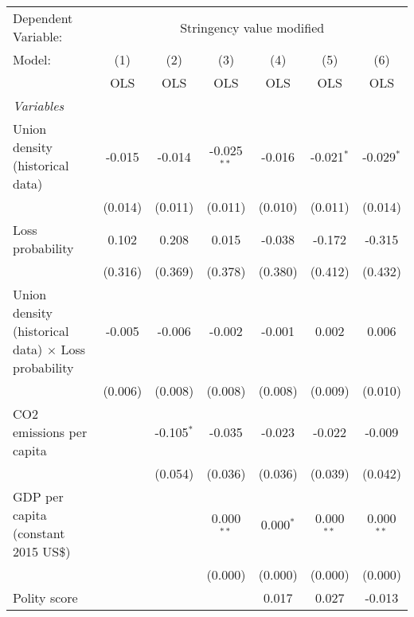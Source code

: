 
\begingroup
\centering
\begin{tabular}{lcccccc}
   \toprule
   Dependent Variable: & \multicolumn{6}{c}{Stringency value modified}\\
   Model:                                                     & (1)     & (2)          & (3)           & (4)         & (5)          & (6)\\  
                                                              &  OLS    & OLS          & OLS           & OLS         & OLS          & OLS\\  
   \midrule
   \emph{Variables}\\
   Union density (historical data)                            & -0.015  & -0.014       & -0.025$^{**}$ & -0.016      & -0.021$^{*}$ & -0.029$^{*}$\\   
                                                              & (0.014) & (0.011)      & (0.011)       & (0.010)     & (0.011)      & (0.014)\\   
   Loss probability                                           & 0.102   & 0.208        & 0.015         & -0.038      & -0.172       & -0.315\\   
                                                              & (0.316) & (0.369)      & (0.378)       & (0.380)     & (0.412)      & (0.432)\\   
   Union density (historical data) $\times$ Loss probability  & -0.005  & -0.006       & -0.002        & -0.001      & 0.002        & 0.006\\   
                                                              & (0.006) & (0.008)      & (0.008)       & (0.008)     & (0.009)      & (0.010)\\   
   CO2 emissions per capita                                   &         & -0.105$^{*}$ & -0.035        & -0.023      & -0.022       & -0.009\\   
                                                              &         & (0.054)      & (0.036)       & (0.036)     & (0.039)      & (0.042)\\   
   GDP per capita (constant 2015 US\$)                        &         &              & 0.000$^{**}$  & 0.000$^{*}$ & 0.000$^{**}$ & 0.000$^{**}$\\   
                                                              &         &              & (0.000)       & (0.000)     & (0.000)      & (0.000)\\   
   Polity score                                               &         &              &               & 0.017       & 0.027        & -0.013\\   

\end{tabular}
